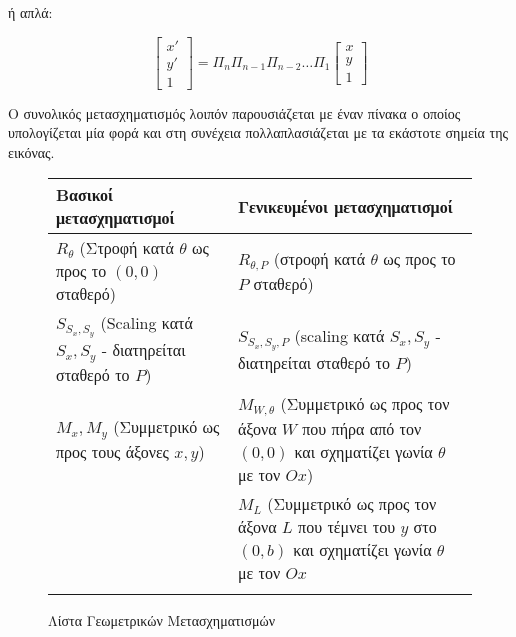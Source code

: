 ή απλά:

\[
\begin{bmatrix}
x' \\ y' \\ 1
\end{bmatrix}
=
\Pi_n \Pi_{n-1} \Pi_{n-2} \ldots \Pi_1
\begin{bmatrix}
x \\ y \\ 1
\end{bmatrix}
\]

Ο συνολικός μετασχηματισμός λοιπόν παρουσιάζεται με έναν πίνακα ο οποίος υπολογίζεται μία φορά και στη συνέχεια πολλαπλασιάζεται με τα εκάστοτε σημεία της εικόνας.






\begin{figure}[htb]
	\begin{center}
	\begin{tabular}{m{}m{}}
	\toprule
	\textbf{Βασικοί μετασχηματισμοί} & \textbf{Γενικευμένοι μετασχηματισμοί} \\
	\midrule
	$R_\theta$ (Στροφή κατά $\theta$ ως προς το $(0,0)$ σταθερό) &  $R_{\theta, P}$ (στροφή κατά $\theta$ ως προς το $P$ σταθερό)\\
	$S_{S_x, S_y}$ (Scaling κατά $S_x, S_y$ - διατηρείται σταθερό το $P$) & $S_{S_x, S_y,P}$ (scaling κατά $S_x, S_y$ - διατηρείται σταθερό το $P$)	 \\
	$M_x, M_y$ (Συμμετρικό ως προς τους άξονες $x,y$) & $M_{W, \theta}$ (Συμμετρικό ως προς τον άξονα $W$ που πήρα από τον $(0, 0)$ και σχηματίζει γωνία $\theta$ με τον $Ox$)\\
	& $M_{L}$ (Συμμετρικό ως προς τον άξονα $L$ που τέμνει του $y$ στο $(0, b)$ και σχηματίζει γωνία $\theta$ με τον $Ox$ \\
	 \\
	\bottomrule
	\end{tabular}
	\end{center}
	\caption{Λίστα Γεωμετρικών Μετασχηματισμών}
\end{figure}


